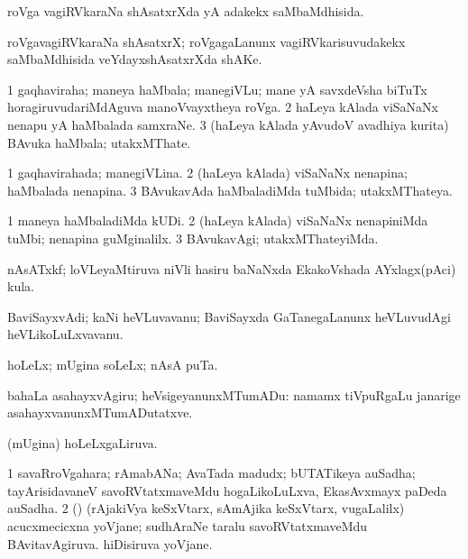 \bentry
{}
\gl{\gu}
\bmng
roVga vagiRVkaraNa shAsatxrXda yA adakekx saMbaMdhisida. 
\emng
\eentry

\bentry
{}
\gl{\nA}
\bmng
roVgavagiRVkaraNa shAsatxrX; roVgagaLanunx vagiRVkarisuvudakekx saMbaMdhisida veYdayxshAsatxrXda shAKe. 
\emng
\eentry

\bentry
{}
\gl{\nA}
\bmng
\bnum
\num{1} gaqhaviraha; maneya haMbala; manegiVLu; mane yA savxdeVsha biTuTx horagiruvudariMdAguva manoVvayxtheya roVga. 
\num{2} haLeya kAlada viSaNaNx nenapu yA haMbalada samxraNe. 
\num{3} (haLeya kAlada yAvudoV avadhiya kurita) BAvuka haMbala; utakxMThate. 
\enum
\emng
\eentry

\bentry
{}
\gl{\gu}
\bmng
\bnum
\num{1} gaqhavirahada; manegiVLina. 
\num{2} (haLeya kAlada) viSaNaNx nenapina; haMbalada nenapina. 
\num{3} BAvukavAda haMbaladiMda tuMbida; utakxMThateya. 
\enum
\emng
\eentry

\bentry
{}
\gl{\kirxvi}
\bmng
\bnum
\num{1} maneya haMbaladiMda kUDi. 
\num{2} (haLeya kAlada) viSaNaNx nenapiniMda tuMbi; nenapina guMginalilx. 
\num{3} BAvukavAgi; utakxMThateyiMda. 
\enum
\emng
\eentry

\bentry
{}
\gl{\nA}
\bmng
nAsATxkf; loVLeyaMtiruva niVli hasiru baNaNxda EkakoVshada AYxlagx(pAci) kula. 
\emng
\eentry

\bentry
{}
\gl{\nA}
\bmng
BaviSayxvAdi; kaNi heVLuvavanu; BaviSayxda GaTanegaLanunx heVLuvudAgi heVLikoLuLxvavanu. 
\emng
\eentry

\bentry
{}
\gl{\nA}
\bmng
hoLeLx; mUgina soLeLx; nAsA puTa. 
\emng

\noindent
\gl{\pagu}
\bmng
{} 
 bahaLa asahayxvAgiru; heVsigeyanunxMTumADu:  namamx tiVpuRgaLu janarige asahayxvanunxMTumADutatxve. 
\emng
\eentry

\bentry
{}
\gl{\gu}
\bmng
(mUgina) hoLeLxgaLiruva. 
\emng
\eentry

\bentry
{}
\gl{\nA}
\bmng
\bnum
\num{1} savaRroVgahara; rAmabANa; AvaTada madudx; bUTATikeya auSadha; tayArisidavaneV savoRVtatxmaveMdu hogaLikoLuLxva, EkasAvxmayx paDeda auSadha. 
\num{2} (\rUpa) (rAjakiVya keSxVtarx, sAmAjika keSxVtarx, \mo vugaLalilx) acucxmecicxna yoVjane; sudhAraNe taralu savoRVtatxmaveMdu BAvitavAgiruva. hiDisiruva yoVjane. 
\enum
\emng
\eentry

